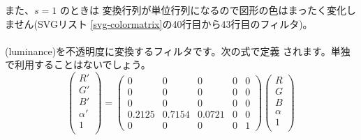 また、$s=1$ のときは
変換行列が単位行列になるので図形の色はまったく変化しません(SVGリスト
\ref{svg-colormatrix}の40行目から43行目のフィルタ)。
\paragraph{}
(luminance)を不透明度に変換するフィルタです。次の式で定義
されます。単独で利用することはないでしょう。
\[
 \left(\begin{array}{c}
  R'\\G'\\B'\\\alpha'\\1\\
       \end{array}\right)=
\left(\begin{array}{ccccc}
  0    &     0    &     0   & 0 & 0\\
  0    &     0    &     0   & 0 & 0\\
  0    &     0    &     0   & 0 & 0\\
 0.2125&   0.7154 &  0.0721 & 0 & 0 \\
  0    &     0    &     0   & 0 & 1
      \end{array}\right)
 \left(\begin{array}{c}
  R\\G\\B\\\alpha\\1\\
       \end{array}\right)
\]

